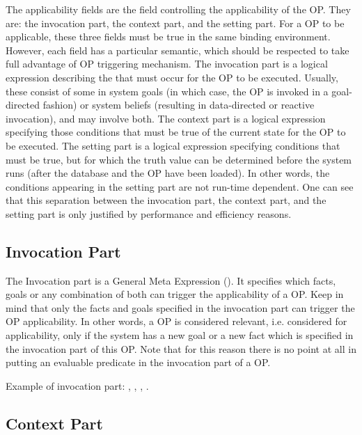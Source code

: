 The applicability fields are the field controlling the applicability of the OP.
They are: the invocation part, the context part, and the setting part. For a OP
to be applicable, these three fields must be true in the same binding
environment. However, each field has a particular semantic, which should be
respected to take full advantage of \COPRS{} OP triggering mechanism. The
invocation part is a logical expression describing the  that must
occur for the OP to be executed. Usually, these consist of some 
in system goals (in which case, the OP is invoked in a goal-directed fashion)
or system beliefs (resulting in data-directed or reactive invocation), and may
involve both. The context part is a logical expression specifying those
conditions that must be true of the current state for the OP to be executed.
The setting part is a logical expression specifying conditions that must be
true, but for which the truth value can be determined before the system runs
(after the database and the OP have been loaded). In other words, the conditions
appearing in the setting part are not run-time dependent. One can see that this
separation between the invocation part, the context part, and the setting part
is only justified by performance and efficiency reasons.



\subsection{Invocation Part}

The Invocation part is a General Meta Expression (). It specifies which facts, goals or any combination of both can
trigger the applicability of a OP. Keep in mind that only the facts
and goals specified in the invocation part can trigger the OP applicability. In
other words, a OP is considered relevant, i.e.  considered for applicability,
only if the system has a new goal or a new fact which is specified in
the invocation part of this OP. Note that for this reason there is no point at
all in putting an evaluable predicate in the invocation part of a OP.

Example of invocation part: \*
, \*
, \*
, \*
.

\subsection{Context Part}


